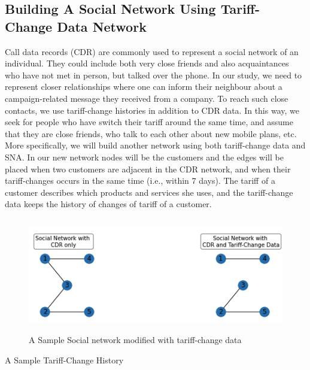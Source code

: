 \documentclass[11pt]{article}
\begin{document}
\subsection{Building A Social Network Using Tariff-Change Data Network}\label{s:micro-world-networks}
Call data records (CDR) are commonly used to represent a social network of an individual. They could include both very close friends and also acquaintances who have not met in person, but talked over the phone. In our study, we need to represent closer relationships where one can inform their neighbour about a campaign-related message they received from a company. To reach such close contacts, we use tariff-change histories in addition to CDR data. In this way, we seek for people who have switch their tariff around the same time, and assume that they are close friends, who talk to each other about new mobile plans, etc. More specifically, we will build another network using both tariff-change data and SNA. In our new network nodes will be the customers and the edges will be placed when two customers are adjacent in the CDR network, and when their tariff-changes occurs in the same time (i.e., within 7 days). The tariff of a customer describes which products and services she uses, and the tariff-change data keeps the history of changes of tariff of a customer.

\begin{figure}[htp]
    \centering
    \includegraphics[height=5cm]{sample_sna_tsna.png}
    \caption{A Sample Social network modified with tariff-change data}
    \label{fig:fig_sample_sna}
\end{figure}
\begin{table}[htb]
    \centering
    \caption[Short Caption for LoT]{A Sample Tariff-Change History}\label{table:tbl_sample_tariff_change_history}
\end{table}
\end{document}
